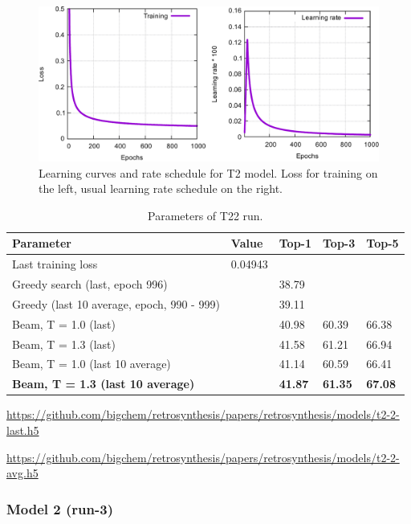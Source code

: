 \documentclass{article}
\begin{document}
\begin{figure}[h!]
  \centering
  \includegraphics[width = 16.5cm]{images/t2-2.pdf}
  \caption{Learning curves and rate schedule for T2 model. Loss for training on the left, usual learning rate schedule on the right.}
  \label{fig:t21}
\end{figure}

\begin{table}[h!]
\caption{Parameters of T22 run.}
  \centering
  \begin{tabular}{p{8.2cm}p{1.5cm}p{1.5cm}p{1.5cm}p{1.5cm}}
    \toprule
    Parameter & Value & Top-1 & Top-3 & Top-5 \\
    \midrule
    Last training loss & 0.04943 & & & \\
    \midrule
    Greedy search (last, epoch 996) & & 38.79 & & \\
    Greedy (last 10 average, epoch, 990 - 999) & & 39.11 & & \\
    \midrule
    Beam, T = 1.0 (last) & & 40.98 & 60.39 & 66.38  \\
    Beam, T = 1.3 (last) & & 41.58 &  61.21 & 66.94 \\ 
    \midrule
    Beam, T = 1.0 (last 10 average) & & 41.14  & 60.59 &  66.41\\
    \textbf{Beam, T = 1.3 (last 10 average)} & &  \textbf{41.87} &  \textbf{61.35} &  \textbf{67.08}\\ 
    \bottomrule
  \end{tabular}
  \label{tbl:t22}

\end{table} 

\url{https://github.com/bigchem/retrosynthesis/papers/retrosynthesis/models/t2-2-last.h5}

\url{https://github.com/bigchem/retrosynthesis/papers/retrosynthesis/models/t2-2-avg.h5}

\newpage
 \subsubsection{Model 2 (run-3)}
 
\end{document}

